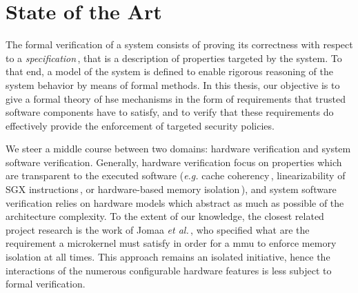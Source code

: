 \chapter{State of the Art}
\label{chapter:relatedwork}


%

\vspace{1cm}%
\noindent
%
The formal verification of a system consists of proving its correctness with
respect to a \emph{specification}\,\cite{gupta1992formal}, that is a description
of properties targeted by the system.
%
To that end, a model of the system is defined to enable rigorous reasoning of
the system behavior by means of formal methods.
%
%
In this thesis, our objective is to give a formal theory of \ac{hse}
mechanisms in the form of requirements that trusted software components have to
satisfy, and to verify that these requirements do effectively provide the
enforcement of targeted security policies.

We steer a middle course between two domains: hardware verification and system
software verification.
%
Generally, hardware verification focus on properties which are transparent to
the executed software (\emph{e.g.} cache
coherency\,\cite{stern1995cachecoherence}, linearizability of SGX
instructions\,\cite{leslie2015linsgx}, or hardware-based memory
isolation\,\cite{lie2003xom}), and system software verification relies on
hardware models which abstract as much as possible of the architecture
complexity.
%
To the extent of our knowledge, the closest related project research is the work
of Jomaa \emph{et al.}\,\cite{jomaa2016mmu}, who specified what are the
requirement a microkernel must satisfy in order for a \ac{mmu} to enforce memory
isolation at all times.
%
This approach remains an isolated initiative, hence the interactions of the
numerous configurable hardware features is less subject to formal verification.

